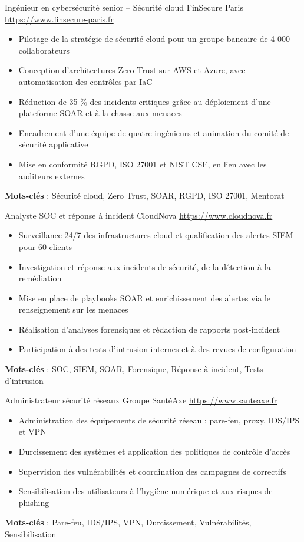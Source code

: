 \documentclass[a4paper, serif, 10pt]{moderncv}
\begin{document}
        {Ingénieur en cybersécurité senior – Sécurité cloud}
        {FinSecure Paris}
        {\url{https://www.finsecure-paris.fr}}
        {}
        {\begin{itemize}
\item Pilotage de la stratégie de sécurité cloud pour un groupe bancaire de 4 000 collaborateurs
\item Conception d'architectures Zero Trust sur AWS et Azure, avec automatisation des contrôles par IaC
\item Réduction de 35 \% des incidents critiques grâce au déploiement d'une plateforme SOAR et à la chasse aux menaces
\item Encadrement d'une équipe de quatre ingénieurs et animation du comité de sécurité applicative
\item Mise en conformité RGPD, ISO 27001 et NIST CSF, en lien avec les auditeurs externes
\end{itemize}
\textbf{Mots-clés} : Sécurité cloud, Zero Trust, SOAR, RGPD, ISO 27001, Mentorat}

        {Analyste SOC et réponse à incident}
        {CloudNova}
        {\url{https://www.cloudnova.fr}}
        {}
        {\begin{itemize}
\item Surveillance 24/7 des infrastructures cloud et qualification des alertes SIEM pour 60 clients
\item Investigation et réponse aux incidents de sécurité, de la détection à la remédiation
\item Mise en place de playbooks SOAR et enrichissement des alertes via le renseignement sur les menaces
\item Réalisation d'analyses forensiques et rédaction de rapports post-incident
\item Participation à des tests d'intrusion internes et à des revues de configuration
\end{itemize}
\textbf{Mots-clés} : SOC, SIEM, SOAR, Forensique, Réponse à incident, Tests d'intrusion}

        {Administrateur sécurité réseaux}
        {Groupe SantéAxe}
        {\url{https://www.santeaxe.fr}}
        {}
        {\begin{itemize}
\item Administration des équipements de sécurité réseau : pare-feu, proxy, IDS/IPS et VPN
\item Durcissement des systèmes et application des politiques de contrôle d'accès
\item Supervision des vulnérabilités et coordination des campagnes de correctifs
\item Sensibilisation des utilisateurs à l'hygiène numérique et aux risques de phishing
\end{itemize}
\textbf{Mots-clés} : Pare-feu, IDS/IPS, VPN, Durcissement, Vulnérabilités, Sensibilisation}
\end{document}
